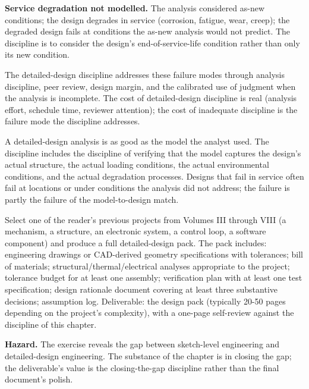 \textbf{Service degradation not modelled.} The analysis considered as-new conditions; the design degrades in service (corrosion, fatigue, wear, creep); the degraded design fails at conditions the as-new analysis would not predict. The discipline is to consider the design's end-of-service-life condition rather than only its new condition.

The detailed-design discipline addresses these failure modes through analysis discipline, peer review, design margin, and the calibrated use of judgment when the analysis is incomplete. The cost of detailed-design discipline is real (analysis effort, schedule time, reviewer attention); the cost of inadequate discipline is the failure mode the discipline addresses.

\begin{principle}
A detailed-design analysis is as good as the model the analyst used. The discipline includes the discipline of verifying that the model captures the design's actual structure, the actual loading conditions, the actual environmental conditions, and the actual degradation processes. Designs that fail in service often fail at locations or under conditions the analysis did not address; the failure is partly the failure of the model-to-design match.
\end{principle}

\begin{project}
Select one of the reader's previous projects from Volumes III through VIII (a mechanism, a structure, an electronic system, a control loop, a software component) and produce a full detailed-design pack. The pack includes: engineering drawings or CAD-derived geometry specifications with tolerances; bill of materials; structural/thermal/electrical analyses appropriate to the project; tolerance budget for at least one assembly; verification plan with at least one test specification; design rationale document covering at least three substantive decisions; assumption log. Deliverable: the design pack (typically 20-50 pages depending on the project's complexity), with a one-page self-review against the discipline of this chapter.

\textbf{Hazard.} The exercise reveals the gap between sketch-level engineering and detailed-design engineering. The substance of the chapter is in closing the gap; the deliverable's value is the closing-the-gap discipline rather than the final document's polish.
\end{project}

